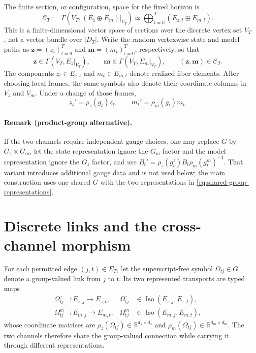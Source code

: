 The finite section, or configuration, space for the fixed horizon is
\begin{equation}
\mathcal C_T
:=
\Gamma\left(V_T,(E_z\oplus E_m)|_{V_T}\right)
\simeq
\bigoplus_{t=0}^{T}\left(E_{z,t}\oplus E_{m,t}\right).
\label{eq:finite-section-configuration-space}
\end{equation}
This is a finite-dimensional vector space of sections over the discrete vertex set $V_T$, not a vector bundle over $|D_T|$.  Write the random vertexwise state and model paths as $\boldsymbol z=(z_t)_{t=0}^{T}$ and $\boldsymbol m=(m_t)_{t=0}^{T}$, respectively, so that
\begin{equation}
\boldsymbol z\in\Gamma\left(V_T,E_z|_{V_T}\right),
\qquad
\boldsymbol m\in\Gamma\left(V_T,E_m|_{V_T}\right),
\qquad
(\boldsymbol z,\boldsymbol m)\in\mathcal C_T.
\label{eq:random-vertex-sections}
\end{equation}
The components $z_t\in E_{z,t}$ and $m_t\in E_{m,t}$ denote realized fiber elements.  After choosing local frames, the same symbols also denote their coordinate columns in $V_z$ and $V_m$.  Under a change of those frames,
\begin{equation}
z_t'=\rho_z(g_t)z_t,
\qquad
m_t'=\rho_m(g_t)m_t.
\label{eq:state-model-gauge-law}
\end{equation}

\paragraph{Remark (product-group alternative).}
If the two channels require independent gauge choices, one may replace $G$ by $G_z\times G_m$, let the state representation ignore the $G_m$ factor and the model representation ignore the $G_z$ factor, and use $B_t'=\rho_z(g_t^z)B_t\rho_m(g_t^m)^{-1}$.  That variant introduces additional gauge data and is not used below; the main construction uses one shared $G$ with the two representations in \cref{eq:shared-group-representations}.

\section{Discrete links and the cross-channel morphism}

For each permitted edge $(j,t)\in E_T$, let the superscript-free symbol $\Omega_{tj}\in G$ denote a group-valued link from $j$ to $t$.  Its two represented transports are typed maps
\begin{equation}
\begin{aligned}
\Omega^z_{tj}&:E_{z,j}\longrightarrow E_{z,t},
&\Omega^z_{tj}&\in\operatorname{Iso}(E_{z,j},E_{z,t}),\\
\Omega^m_{tj}&:E_{m,j}\longrightarrow E_{m,t},
&\Omega^m_{tj}&\in\operatorname{Iso}(E_{m,j},E_{m,t}),
\end{aligned}
\label{eq:typed-associated-transports}
\end{equation}
whose coordinate matrices are $\rho_z(\Omega_{tj})\in\mathbb R^{d_z\times d_z}$ and $\rho_m(\Omega_{tj})\in\mathbb R^{d_m\times d_m}$.  The two channels therefore share the group-valued connection while carrying it through different representations.

